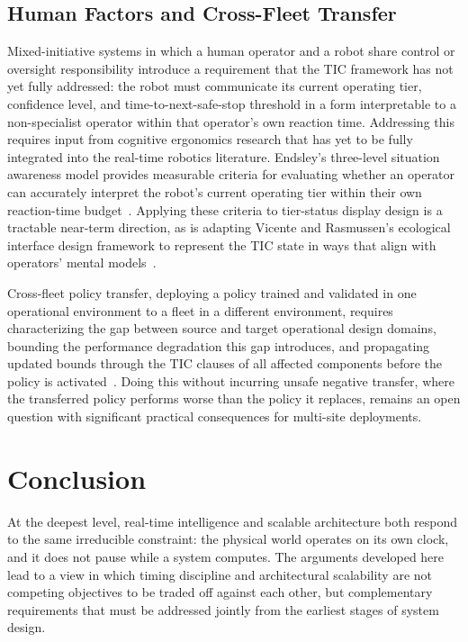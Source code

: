 \documentclass[smallextended]{svjour3}
\begin{document}
\subsection{Human Factors and Cross-Fleet Transfer}

Mixed-initiative systems in which a human operator and a robot share control or oversight responsibility introduce a requirement that the TIC framework has not yet fully addressed: the robot must communicate its current operating tier, confidence level, and time-to-next-safe-stop threshold in a form interpretable to a non-specialist operator within that operator's own reaction time. Addressing this requires input from cognitive ergonomics research that has yet to be fully integrated into the real-time robotics literature. Endsley's three-level situation awareness model provides measurable criteria for evaluating whether an operator
can accurately interpret the robot's current operating tier within their own reaction-time budget~\cite{endsley1995}. Applying these criteria to tier-status display design is a tractable near-term direction, as is adapting Vicente and Rasmussen's ecological interface design framework to represent the {TIC} state in ways that align with operators' mental models~\cite{vicente1992eid}.

Cross-fleet policy transfer, deploying a policy trained and validated in one
operational environment to a fleet in a different environment, requires characterizing the gap between source and target operational design domains, bounding the performance degradation this gap introduces, and propagating updated bounds through the TIC clauses of all affected components before the policy is activated~\cite{brunke2022}. Doing this
without incurring unsafe negative transfer, where the transferred policy performs worse than the policy it replaces, remains an open question with significant practical consequences for multi-site deployments.

\section{Conclusion}
\label{sec:conc}

At the deepest level, real-time intelligence and scalable architecture both respond to the same irreducible constraint: the physical world operates on its own clock, and it does not pause while a system computes. The arguments developed here lead to a view in which timing discipline and architectural scalability are not competing objectives to be traded off against each other, but complementary requirements that must be addressed jointly from the earliest stages of system design.
\end{document}
